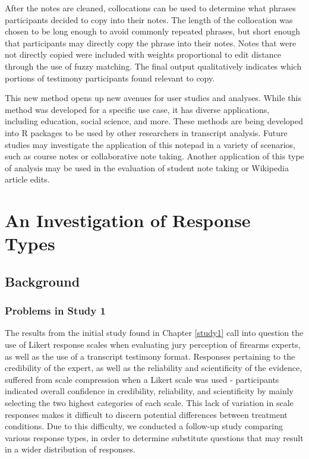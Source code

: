 \documentclass[print]{nuthesis}
\begin{document}
After the notes are cleaned, collocations can be used to determine what phrases participants decided to copy into their notes.
The length of the collocation was chosen to be long enough to avoid commonly repeated phrases, but short enough that participants may directly copy the phrase into their notes.
Notes that were not directly copied were included with weights proportional to edit distance through the use of fuzzy matching.
The final output qualitatively indicates which portions of testimony participants found relevant to copy.

This new method opens up new avenues for user studies and analyses.
While this method was developed for a specific use case, it has diverse applications, including education, social science, and more.
These methods are being developed into R packages to be used by other
researchers in transcript analysis.
Future studies may investigate the application of this notepad in a variety of scenarios, such as course notes or collaborative note
taking.
Another application of this type of analysis may be used in the evaluation of student note taking or Wikipedia article edits.

\hypertarget{study2}{%
\chapter{An Investigation of Response Types}\label{study2}}

\hypertarget{background-1}{%
\section{Background}\label{background-1}}

\hypertarget{problems-in-study-1}{%
\subsection{Problems in Study 1}\label{problems-in-study-1}}

The results from the initial study found in Chapter \ref{study1} call into question the use of Likert response scales when evaluating jury perception of firearms experts, as well as the use of a transcript testimony format.
Responses pertaining to the credibility of the expert, as well as the reliability and scientificity of the evidence, suffered from scale compression when a Likert scale was used - participants indicated overall confidence in credibility, reliability, and scientificity by mainly selecting the two highest categories of each scale.
This lack of variation in scale responses makes it difficult to discern potential differences between treatment conditions.
Due to this difficulty, we conducted a follow-up study comparing various response types, in order to determine substitute questions that may result in a wider distribution of responses.
\end{document}
